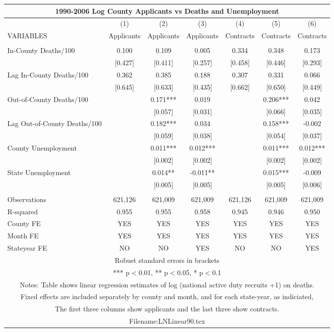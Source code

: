 \documentclass[]{article}
\begin{document}
\begin{tabular}{lcccccc}
\multicolumn{7}{c}{1990-2006 Log County Applicants vs Deaths and Unemployment} \\ \hline
 & (1) & (2) & (3) & (4) & (5) & (6) \\
VARIABLES & Applicants & Applicants & Applicants & Contracts & Contracts & Contracts \\ \hline
 &  &  &  &  &  &  \\
In-County Deaths/100 & 0.100 & 0.109 & 0.005 & 0.334 & 0.348 & 0.173 \\
 & [0.427] & [0.411] & [0.257] & [0.458] & [0.446] & [0.293] \\
Lag In-County Deaths/100 & 0.362 & 0.385 & 0.188 & 0.307 & 0.331 & 0.066 \\
 & [0.645] & [0.633] & [0.435] & [0.662] & [0.650] & [0.449] \\
Out-of-County Deaths/100 &  & 0.171*** & 0.019 &  & 0.206*** & 0.042 \\
 &  & [0.057] & [0.031] &  & [0.066] & [0.035] \\
Lag Out-of-County Deaths/100 &  & 0.182*** & 0.034 &  & 0.158*** & -0.002 \\
 &  & [0.059] & [0.038] &  & [0.054] & [0.037] \\
County Unemployment &  & 0.011*** & 0.012*** &  & 0.011*** & 0.012*** \\
 &  & [0.002] & [0.002] &  & [0.002] & [0.002] \\
State Unemployment &  & 0.014** & -0.011** &  & 0.015*** & -0.009 \\
 &  & [0.005] & [0.005] &  & [0.005] & [0.006] \\
 &  &  &  &  &  &  \\
Observations & 621,126 & 621,009 & 621,009 & 621,126 & 621,009 & 621,009 \\
R-squared & 0.955 & 0.955 & 0.958 & 0.945 & 0.946 & 0.950 \\
County FE & YES & YES & YES & YES & YES & YES \\
Month FE & YES & YES & YES & YES & YES & YES \\
 Stateyear FE & NO & NO & YES & NO & NO & YES \\ \hline
\multicolumn{7}{c}{ Robust standard errors in brackets} \\
\multicolumn{7}{c}{ *** p$<$0.01, ** p$<$0.05, * p$<$0.1} \\
\multicolumn{7}{c}{ Notes: Table shows linear regression estimates of log (national active duty recruits +1) on deaths.} \\
\multicolumn{7}{c}{ Fixed effects are included separately by county and month, and for each state-year, as indiciated,} \\
\multicolumn{7}{c}{ The first three columns show applicants and the last three show contracts.} \\
\multicolumn{7}{c}{ Filename:LNLinear90.tex} \\
\end{tabular}
\end{document}
